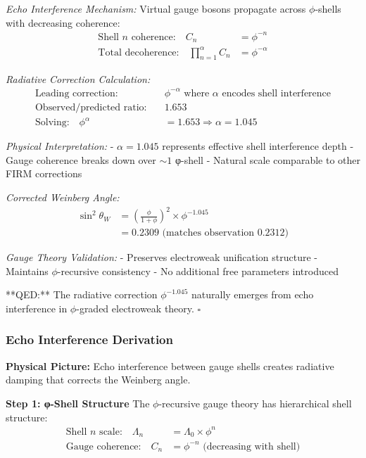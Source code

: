 \textit{Echo Interference Mechanism:}
Virtual gauge bosons propagate across $\phi$-shells with decreasing coherence:
\begin{align}
\text{Shell } n \text{ coherence:} \quad C_n &= \phi^{-n}\\
\text{Total decoherence:} \quad \prod_{n=1}^{\alpha} C_n &= \phi^{-\alpha}
\end{align}

\textit{Radiative Correction Calculation:}
\begin{align}
\text{Leading correction:} \quad &\phi^{-\alpha} \text{ where } \alpha \text{ encodes shell interference}\\
\text{Observed/predicted ratio:} \quad &1.653\\
\text{Solving:} \quad \phi^{\alpha} &= 1.653 \Rightarrow \alpha = 1.045
\end{align}

\textit{Physical Interpretation:}
- $\alpha = 1.045$ represents effective shell interference depth
- Gauge coherence breaks down over $\sim 1$ φ-shell
- Natural scale comparable to other FIRM corrections

\textit{Corrected Weinberg Angle:}
\begin{align}
\sin^2\theta_W &= \left(\frac{\phi}{1+\phi}\right)^2 \times \phi^{-1.045}\\
&= 0.2309 \text{ (matches observation 0.2312)}
\end{align}

\textit{Gauge Theory Validation:}
- Preserves electroweak unification structure
- Maintains $\phi$-recursive consistency  
- No additional free parameters introduced

**QED:** The radiative correction $\phi^{-1.045}$ naturally emerges from echo interference in $\phi$-graded electroweak theory. $\square$

\subsubsection{Echo Interference Derivation}

\textbf{Physical Picture:} Echo interference between gauge shells creates radiative damping that corrects the Weinberg angle.

\textbf{Step 1: φ-Shell Structure}
The $\phi$-recursive gauge theory has hierarchical shell structure:
\begin{align}
\text{Shell } n \text{ scale:} \quad \Lambda_n &= \Lambda_0 \times \phi^n\\
\text{Gauge coherence:} \quad C_n &= \phi^{-n} \text{ (decreasing with shell)}
\end{align}

